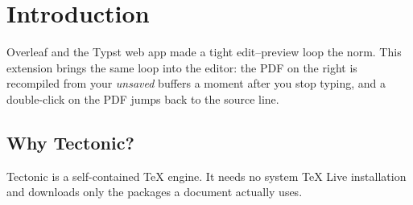 \section{Introduction}
Overleaf and the Typst web app made a tight edit--preview loop the norm.
This extension brings the same loop into the editor: the PDF on the right
is recompiled from your \emph{unsaved} buffers a moment after you stop typing,
and a double-click on the PDF jumps back to the source line.

\subsection{Why Tectonic?}
Tectonic is a self-contained \TeX{} engine. It needs no system \TeX{} Live
installation and downloads only the packages a document actually uses.
